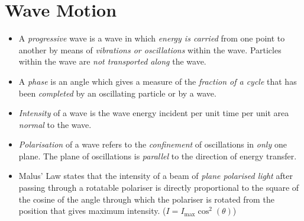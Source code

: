 \documentclass[oneside]{book}
\begin{document}
\chapter{Wave Motion}
\begin{itemize}
    \item A \textit{progressive} wave is a wave in which \emph{energy is carried} from one point to another by means of \emph{vibrations or oscillations} within the wave. Particles within the wave are \emph{not transported along} the wave.
    \item A \textit{phase} is an angle which gives a measure of the \emph{fraction of a cycle} that has been \emph{completed} by an oscillating particle or by a wave.
    \item \emph{Intensity} of a wave is the wave energy incident per unit time per unit area \emph{normal} to the wave.
    \item \textit{Polarisation} of a wave refers to the \emph{confinement} of oscillations in \emph{only} one plane. The plane of oscillations is \emph{parallel} to the direction of energy transfer.  
    \item Malus' Law states that the intensity of a beam of \emph{plane polarised light} after passing through a rotatable polariser is directly proportional to the square of the cosine of the angle through which the polariser is rotated from the position that gives maximum intensity. (\(I=I_{\text{max}}\cos^2(\theta)\))
\end{itemize}
\end{document}

